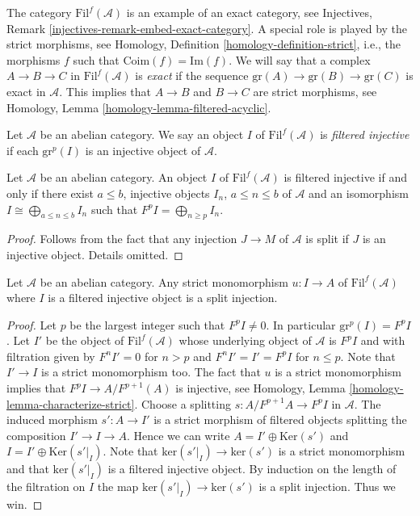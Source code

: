 \medskip\noindent
The category $\text{Fil}^f(\mathcal{A})$ is an example of an
exact category, see
Injectives, Remark \ref{injectives-remark-embed-exact-category}.
A special role is played by the strict morphisms, see
Homology, Definition \ref{homology-definition-strict},
i.e., the morphisms $f$ such that $\text{Coim}(f) = \text{Im}(f)$.
We will say that a complex $A \to B \to C$ in $\text{Fil}^f(\mathcal{A})$ is
{\it exact} if the sequence $\text{gr}(A) \to \text{gr}(B) \to \text{gr}(C)$
is exact in $\mathcal{A}$. This implies that $A \to B$ and $B \to C$
are strict morphisms, see
Homology, Lemma \ref{homology-lemma-filtered-acyclic}.

\begin{definition}
\label{definition-filtered-complexes-notation}
Let $\mathcal{A}$ be an abelian category.
We say an object $I$ of $\text{Fil}^f(\mathcal{A})$
is {\it filtered injective} if each $\text{gr}^p(I)$ is
an injective object of $\mathcal{A}$.
\end{definition}

\begin{lemma}
\label{lemma-filtered-injective}
Let $\mathcal{A}$ be an abelian category.
An object $I$ of $\text{Fil}^f(\mathcal{A})$ is filtered injective
if and only if
there exist $a \leq b$, injective objects $I_n$, $a \leq n \leq b$
of $\mathcal{A}$ and an isomorphism $I \cong \bigoplus_{a \leq n \leq b} I_n$
such that $F^pI = \bigoplus_{n \geq p} I_n$.
\end{lemma}

\begin{proof}
Follows from the fact that any injection $J \to M$ of $\mathcal{A}$
is split if $J$ is an injective object. Details omitted.
\end{proof}

\begin{lemma}
\label{lemma-split-strict-monomorphism}
Let $\mathcal{A}$ be an abelian category.
Any strict monomorphism $u : I \to A$ of $\text{Fil}^f(\mathcal{A})$
where $I$ is a filtered injective object is a split injection.
\end{lemma}

\begin{proof}
Let $p$ be the largest integer such that $F^pI \not = 0$.
In particular $\text{gr}^p(I) = F^pI$.
Let $I'$ be the object of $\text{Fil}^f(\mathcal{A})$ whose
underlying object of $\mathcal{A}$ is $F^pI$ and with filtration
given by $F^nI' = 0$ for $n > p$ and $F^nI' = I' = F^pI$ for
$n \leq p$. Note that $I' \to I$ is a strict monomorphism too.
The fact that $u$ is a strict monomorphism implies that
$F^pI \to A/F^{p + 1}(A)$ is injective, see
Homology, Lemma \ref{homology-lemma-characterize-strict}.
Choose a splitting $s : A/F^{p + 1}A \to F^pI$ in $\mathcal{A}$.
The induced morphism $s' : A \to I'$ is a strict morphism of
filtered objects splitting the composition $I' \to I \to A$.
Hence we can write $A = I' \oplus \text{Ker}(s')$ and
$I = I' \oplus \text{Ker}(s'|_I)$. Note that
$\text{ker}(s'|_I) \to \text{ker}(s')$ is a strict monomorphism
and that $\text{ker}(s'|_I)$ is a filtered injective object.
By induction on the length of the filtration on $I$ the map
$\text{ker}(s'|_I) \to \text{ker}(s')$ is a split injection.
Thus we win.
\end{proof}

